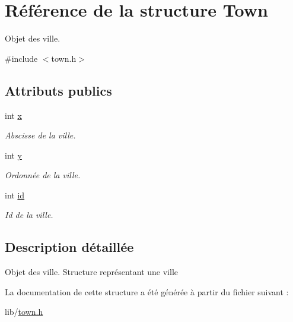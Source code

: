 \hypertarget{structTown}{
\section{Référence de la structure Town}
\label{structTown}
}


Objet des ville.  




{\ttfamily \#include $<$town.h$>$}

\subsection*{Attributs publics}
\begin{DoxyCompactItemize}
\item 
\hypertarget{structTown_a94ac9f23445b2bc5d3f148b9ae044c04}{
int \hyperlink{structTown_a94ac9f23445b2bc5d3f148b9ae044c04}{x}}
\label{structTown_a94ac9f23445b2bc5d3f148b9ae044c04}

\begin{DoxyCompactList}\small\item\em Abscisse de la ville. \item\end{DoxyCompactList}\item 
\hypertarget{structTown_ad0221f06d5fafb6e677034f3e95f23f2}{
int \hyperlink{structTown_ad0221f06d5fafb6e677034f3e95f23f2}{y}}
\label{structTown_ad0221f06d5fafb6e677034f3e95f23f2}

\begin{DoxyCompactList}\small\item\em Ordonnée de la ville. \item\end{DoxyCompactList}\item 
\hypertarget{structTown_a3fd25ddbb4f43f39fb8ccd507c8b8b2b}{
int \hyperlink{structTown_a3fd25ddbb4f43f39fb8ccd507c8b8b2b}{id}}
\label{structTown_a3fd25ddbb4f43f39fb8ccd507c8b8b2b}

\begin{DoxyCompactList}\small\item\em Id de la ville. \item\end{DoxyCompactList}\end{DoxyCompactItemize}


\subsection{Description détaillée}
Objet des ville. Structure représentant une ville 

La documentation de cette structure a été générée à partir du fichier suivant :\begin{DoxyCompactItemize}
\item 
lib/\hyperlink{town_8h}{town.h}\end{DoxyCompactItemize}
